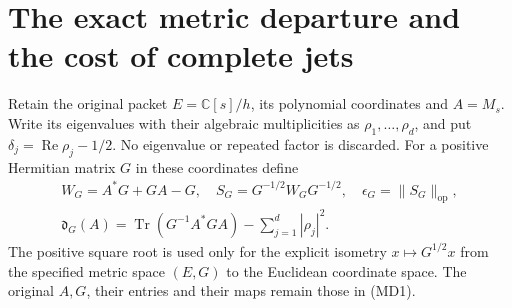 \section{The exact metric departure and the cost of complete jets}
\label{sec:metric-departure}
Retain the original packet \(E=\mathbb C[s]/h\), its polynomial
coordinates and \(A=M_s\). Write its eigenvalues with their algebraic
multiplicities as \(\rho_1,\ldots,\rho_d\), and put
\(\delta_j=\operatorname{Re}\rho_j-1/2\). No eigenvalue or repeated
factor is discarded. For a positive Hermitian matrix \(G\) in these
coordinates define
\[
 \begin{gathered}
 W_G=A^*G+GA-G,\quad S_G=G^{-1/2}W_GG^{-1/2},\quad
 \epsilon_G=\|S_G\|_{\mathrm{op}},\\
 \mathfrak d_G(A)=\operatorname{Tr}(G^{-1}A^*GA)
                          -\sum_{j=1}^d|\rho_j|^2 .
 \end{gathered}
 \tag{MD1}
\]
The positive square root is used only for the explicit isometry
\(x\mapsto G^{1/2}x\) from the specified metric space \((E,G)\)
to the Euclidean coordinate space. The original \(A,G\), their
entries and their maps remain those in (MD1).

